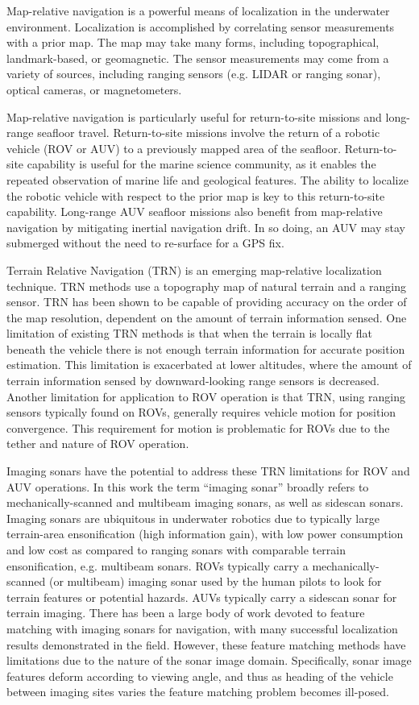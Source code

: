 Map-relative navigation is a powerful means of localization in the underwater environment.  
Localization is accomplished by correlating sensor measurements with a prior map. 
The map may take many forms, including topographical, landmark-based, or geomagnetic.
The sensor measurements may come from a variety of sources, including ranging sensors (e.g. LIDAR or ranging sonar), optical cameras, or magnetometers.

Map-relative navigation is particularly useful for return-to-site missions and long-range seafloor travel.  
Return-to-site missions involve the return of a robotic vehicle (ROV or AUV) to a previously mapped area of the seafloor.  
Return-to-site capability is useful for the marine science community, as it enables the repeated observation of marine life and geological features.  
The ability to localize the robotic vehicle with respect to the prior map is key to this return-to-site capability. 
Long-range AUV seafloor missions also benefit from map-relative navigation by mitigating inertial navigation drift. In so doing, an AUV may stay submerged without the need to re-surface for a GPS fix.

Terrain Relative Navigation (TRN) is an emerging map-relative localization technique.  
TRN methods use a topography map of natural terrain and a ranging sensor. 
TRN has been shown to be capable of providing accuracy on the order of the map resolution, dependent on the amount of terrain information sensed.
One limitation of existing TRN methods is that when the terrain is locally flat beneath the vehicle there is not enough terrain information for accurate position estimation.
This limitation is exacerbated at lower altitudes, where the amount of terrain information sensed by downward-looking range sensors is decreased.
Another limitation for application to ROV operation is that TRN, using ranging sensors typically found on ROVs, generally requires vehicle motion for position convergence.
This requirement for motion is problematic for ROVs due to the tether and nature of ROV operation.

Imaging sonars have the potential to address these TRN limitations for ROV and AUV operations.  In this work the term ``imaging sonar'' broadly refers to mechanically-scanned and multibeam imaging sonars, as well as sidescan sonars.
Imaging sonars are ubiquitous in underwater robotics due to typically large terrain-area ensonification (high information gain), with low power consumption and low cost as compared to ranging sonars with comparable terrain ensonification, e.g. multibeam sonars.
ROVs typically carry a mechanically-scanned (or multibeam) imaging sonar used by the human pilots to look for terrain features or potential hazards.
AUVs typically carry a sidescan sonar for terrain imaging.
There has been a large body of work devoted to feature matching with imaging sonars for navigation, with many successful localization results demonstrated in the field.
However, these feature matching methods have limitations due to the nature of the sonar image domain.
Specifically, sonar image features deform according to viewing angle, and thus as heading of the vehicle between imaging sites varies the feature matching problem becomes ill-posed.

